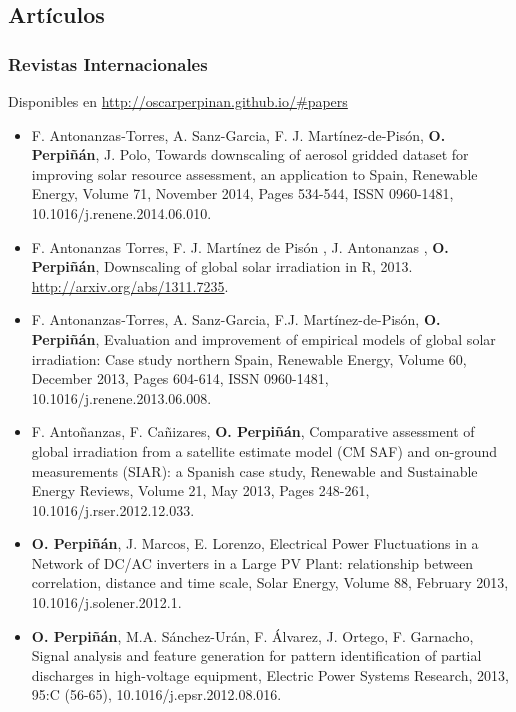 \documentclass[article, a4paper]{memoir}
\begin{document}
\subsection{Artículos}
\label{sec-5-2}
\subsubsection{Revistas Internacionales}
\label{sec-5-2-1}
Disponibles en \url{http://oscarperpinan.github.io/#papers}

\begin{itemize}
\item F. Antonanzas-Torres, A. Sanz-Garcia, F. J. Martínez-de-Pisón,
\textbf{O. Perpiñán}, J. Polo, Towards downscaling of aerosol gridded
dataset for improving solar resource assessment, an application to
Spain, Renewable Energy, Volume 71, November 2014, Pages 534-544,
ISSN 0960-1481, 10.1016/j.renene.2014.06.010.

\item F. Antonanzas Torres, F. J. Martínez de Pisón , J. Antonanzas ,
  \textbf{O. Perpiñán}, Downscaling of global solar irradiation in R, 2013.
  \url{http://arxiv.org/abs/1311.7235}.

\item F. Antonanzas-Torres, A. Sanz-Garcia, F.J. Martínez-de-Pisón,
\textbf{O. Perpiñán}, Evaluation and improvement of empirical models of
global solar irradiation: Case study northern Spain, Renewable
Energy, Volume 60, December 2013, Pages 604-614, ISSN 0960-1481,
10.1016/j.renene.2013.06.008.

\item F. Antoñanzas, F. Cañizares, \textbf{O. Perpiñán}, Comparative assessment of
global irradiation from a satellite estimate model (CM SAF) and
on-ground measurements (SIAR): a Spanish case study, Renewable and
Sustainable Energy Reviews, Volume 21, May 2013, Pages 248-261,
10.1016/j.rser.2012.12.033.

\item \textbf{O. Perpiñán}, J. Marcos, E. Lorenzo, Electrical Power Fluctuations in
a Network of DC/AC inverters in a Large PV Plant: relationship
between correlation, distance and time scale, Solar Energy, Volume
88, February 2013, 10.1016/j.solener.2012.1.

\item \textbf{O. Perpiñán}, M.A. Sánchez-Urán, F. Álvarez, J. Ortego, F. Garnacho,
Signal analysis and feature generation for pattern identification of
partial discharges in high-voltage equipment, Electric Power Systems
Research, 2013, 95:C (56-65), 10.1016/j.epsr.2012.08.016.


\end{itemize}
\end{document}
